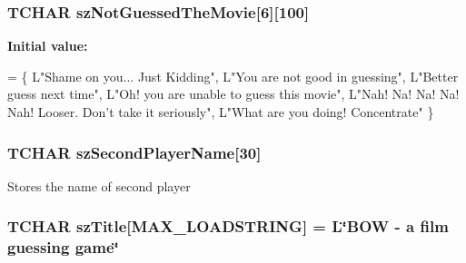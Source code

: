 \subsubsection[{sz\+Not\+Guessed\+The\+Movie}]{\setlength{\rightskip}{0pt plus 5cm}T\+C\+H\+A\+R sz\+Not\+Guessed\+The\+Movie\mbox{[}6\mbox{]}\mbox{[}100\mbox{]}}\label{_b_o_w-a_01film_01guessing_01game_8cpp_a405b15b25b866dd610f5c107ded83b8e}
{\bfseries Initial value\+:}
\begin{DoxyCode}
= \{
        L\textcolor{stringliteral}{"Shame on you... Just Kidding"},
        L\textcolor{stringliteral}{"You are not good in guessing"},
        L\textcolor{stringliteral}{"Better guess next time"},
        L\textcolor{stringliteral}{"Oh! you are unable to guess this movie"},
        L\textcolor{stringliteral}{"Nah! Na! Na! Na! Nah! Looser. Don't take it seriously"},
        L\textcolor{stringliteral}{"What are you doing! Concentrate"}
\}
\end{DoxyCode}
\hypertarget{_b_o_w-a_01film_01guessing_01game_8cpp_a41b8733f446795d8c7f235a56942fdde}{}
\subsubsection[{sz\+Second\+Player\+Name}]{\setlength{\rightskip}{0pt plus 5cm}T\+C\+H\+A\+R sz\+Second\+Player\+Name\mbox{[}30\mbox{]}}\label{_b_o_w-a_01film_01guessing_01game_8cpp_a41b8733f446795d8c7f235a56942fdde}
Stores the name of second player \hypertarget{_b_o_w-a_01film_01guessing_01game_8cpp_a0255997040d96a52f933b0c0d4bd8e01}{}
\subsubsection[{sz\+Title}]{\setlength{\rightskip}{0pt plus 5cm}T\+C\+H\+A\+R sz\+Title\mbox{[}{\bf M\+A\+X\+\_\+\+L\+O\+A\+D\+S\+T\+R\+I\+N\+G}\mbox{]} = L\char`\"{}B\+O\+W -\/ a film guessing game\char`\"{}}\label{_b_o_w-a_01film_01guessing_01game_8cpp_a0255997040d96a52f933b0c0d4bd8e01}
\hypertarget{_b_o_w-a_01film_01guessing_01game_8cpp_ac428b0bb455914397f2929cc9a3eb9e4}{}

